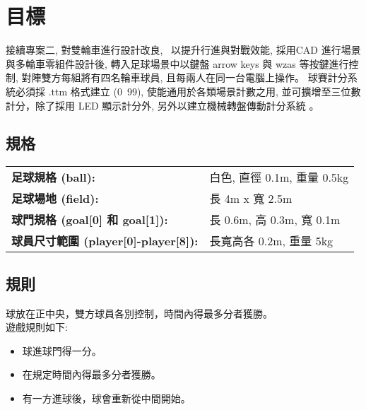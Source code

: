 \chapter{目標}
接續專案二, 對雙輪車進行設計改良,  以提升行進與對戰效能, 採用CAD 進行場景與多輪車零組件設計後, 轉入足球場景中以鍵盤 arrow keys 與 wzas 等按鍵進行控制, 對陣雙方每組將有四名輪車球員, 且每兩人在同一台電腦上操作。
球賽計分系統必須採 .ttm 格式建立 (0~99), 使能通用於各類場景計數之用, 並可擴增至三位數計分，除了採用 LED 顯示計分外, 另外以建立機械轉盤傳動計分系統 。

\section{規格}
\begin{tabular}{p{8cm}p{20cm}}
  \textbf{足球規格 (ball):} & 白色, 直徑 0.1m, 重量 0.5kg \\
  \textbf{足球場地 (field):} & 長 4m x 寬 2.5m \\
  \textbf{球門規格 (goal[0] 和 goal[1]):} & 長 0.6m, 高 0.3m, 寬 0.1m \\
  \textbf{球員尺寸範圍 (player[0]-player[8]):} & 長寬高各 0.2m, 重量 5kg \\
\end{tabular}

\section{規則}
球放在正中央，雙方球員各別控制，時間內得最多分者獲勝。 \\
遊戲規則如下: \\
\begin{itemize}[label=\textbullet]
\item 球進球門得一分。
\item 在規定時間內得最多分者獲勝。
\item 有一方進球後，球會重新從中間開始。
\end{itemize}
